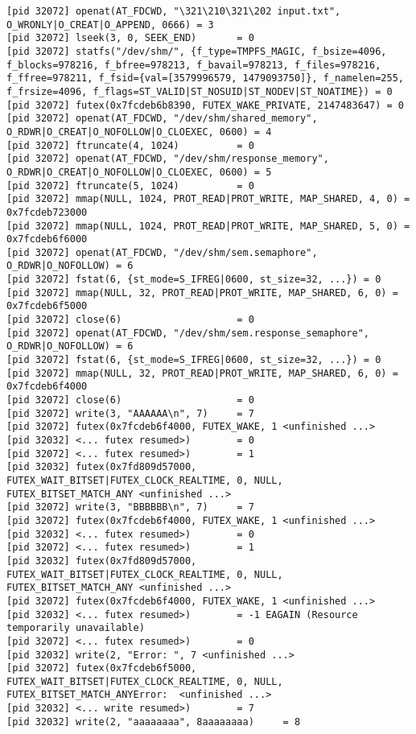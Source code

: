 \documentclass[a4paper, 14pt]{article}
\begin{document}
\begin{lstlisting}
[pid 32072] openat(AT_FDCWD, "\321\210\321\202 input.txt", O_WRONLY|O_CREAT|O_APPEND, 0666) = 3
[pid 32072] lseek(3, 0, SEEK_END)       = 0
[pid 32072] statfs("/dev/shm/", {f_type=TMPFS_MAGIC, f_bsize=4096, f_blocks=978216, f_bfree=978213, f_bavail=978213, f_files=978216, f_ffree=978211, f_fsid={val=[3579996579, 1479093750]}, f_namelen=255, f_frsize=4096, f_flags=ST_VALID|ST_NOSUID|ST_NODEV|ST_NOATIME}) = 0
[pid 32072] futex(0x7fcdeb6b8390, FUTEX_WAKE_PRIVATE, 2147483647) = 0
[pid 32072] openat(AT_FDCWD, "/dev/shm/shared_memory", O_RDWR|O_CREAT|O_NOFOLLOW|O_CLOEXEC, 0600) = 4
[pid 32072] ftruncate(4, 1024)          = 0
[pid 32072] openat(AT_FDCWD, "/dev/shm/response_memory", O_RDWR|O_CREAT|O_NOFOLLOW|O_CLOEXEC, 0600) = 5
[pid 32072] ftruncate(5, 1024)          = 0
[pid 32072] mmap(NULL, 1024, PROT_READ|PROT_WRITE, MAP_SHARED, 4, 0) = 0x7fcdeb723000
[pid 32072] mmap(NULL, 1024, PROT_READ|PROT_WRITE, MAP_SHARED, 5, 0) = 0x7fcdeb6f6000
[pid 32072] openat(AT_FDCWD, "/dev/shm/sem.semaphore", O_RDWR|O_NOFOLLOW) = 6
[pid 32072] fstat(6, {st_mode=S_IFREG|0600, st_size=32, ...}) = 0
[pid 32072] mmap(NULL, 32, PROT_READ|PROT_WRITE, MAP_SHARED, 6, 0) = 0x7fcdeb6f5000
[pid 32072] close(6)                    = 0
[pid 32072] openat(AT_FDCWD, "/dev/shm/sem.response_semaphore", O_RDWR|O_NOFOLLOW) = 6
[pid 32072] fstat(6, {st_mode=S_IFREG|0600, st_size=32, ...}) = 0
[pid 32072] mmap(NULL, 32, PROT_READ|PROT_WRITE, MAP_SHARED, 6, 0) = 0x7fcdeb6f4000
[pid 32072] close(6)                    = 0
[pid 32072] write(3, "AAAAAA\n", 7)     = 7
[pid 32072] futex(0x7fcdeb6f4000, FUTEX_WAKE, 1 <unfinished ...>
[pid 32032] <... futex resumed>)        = 0
[pid 32072] <... futex resumed>)        = 1
[pid 32032] futex(0x7fd809d57000, FUTEX_WAIT_BITSET|FUTEX_CLOCK_REALTIME, 0, NULL, FUTEX_BITSET_MATCH_ANY <unfinished ...>
[pid 32072] write(3, "BBBBBB\n", 7)     = 7
[pid 32072] futex(0x7fcdeb6f4000, FUTEX_WAKE, 1 <unfinished ...>
[pid 32032] <... futex resumed>)        = 0
[pid 32072] <... futex resumed>)        = 1
[pid 32032] futex(0x7fd809d57000, FUTEX_WAIT_BITSET|FUTEX_CLOCK_REALTIME, 0, NULL, FUTEX_BITSET_MATCH_ANY <unfinished ...>
[pid 32072] futex(0x7fcdeb6f4000, FUTEX_WAKE, 1 <unfinished ...>
[pid 32032] <... futex resumed>)        = -1 EAGAIN (Resource temporarily unavailable)
[pid 32072] <... futex resumed>)        = 0
[pid 32032] write(2, "Error: ", 7 <unfinished ...>
[pid 32072] futex(0x7fcdeb6f5000, FUTEX_WAIT_BITSET|FUTEX_CLOCK_REALTIME, 0, NULL, FUTEX_BITSET_MATCH_ANYError:  <unfinished ...>
[pid 32032] <... write resumed>)        = 7
[pid 32032] write(2, "aaaaaaaa", 8aaaaaaaa)     = 8

\end{lstlisting}
\end{document}
